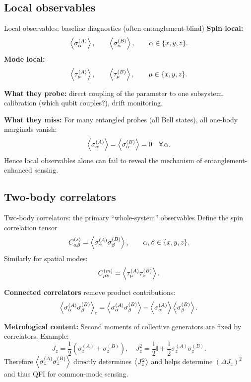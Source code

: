 \documentclass[aspectratio=169]{beamer}
\newcommand{\Id}{\mathbb{I}}
\newcommand{\sA}[1]{\sigma_{#1}^{(A)}}
\newcommand{\sB}[1]{\sigma_{#1}^{(B)}}
\newcommand{\tA}[1]{\tau_{#1}^{(A)}}
\newcommand{\tB}[1]{\tau_{#1}^{(B)}}
\newcommand{\Jop}[1]{J_{#1}}
\begin{document}
\subsection{Local observables}

\begin{frame}{Local observables: baseline diagnostics (often entanglement-blind)}
\small
\textbf{Spin local:}
\[
\expval{\sA{\alpha}},\qquad \expval{\sB{\alpha}},
\qquad \alpha\in\{x,y,z\}.
\]
\textbf{Mode local:}
\[
\expval{\tA{\mu}},\qquad \expval{\tB{\mu}},
\qquad \mu\in\{x,y,z\}.
\]

\vspace{0.35em}
\textbf{What they probe:}
direct coupling of the parameter to one subsystem, calibration (which qubit couples?), drift monitoring.

\vspace{0.35em}
\textbf{What they miss:}
For many entangled probes (all Bell states), all one-body marginals vanish:
\[
\expval{\sA{\alpha}}=\expval{\sB{\alpha}}=0\quad \forall\,\alpha.
\]
Hence local observables alone can fail to reveal the mechanism of entanglement-enhanced sensing.
\end{frame}

\subsection{Two-body correlators}

\begin{frame}{Two-body correlators: the primary ``whole-system'' observables}
\small
Define the spin correlation tensor
\[
C_{\alpha\beta}^{(s)}=\expval{\sA{\alpha}\sB{\beta}},
\qquad \alpha,\beta\in\{x,y,z\}.
\]
Similarly for spatial modes:
\[
C_{\mu\nu}^{(m)}=\expval{\tA{\mu}\tB{\nu}}.
\]

\vspace{0.35em}
\textbf{Connected correlators} remove product contributions:
\[
\expval{\sA{\alpha}\sB{\beta}}_c=
\expval{\sA{\alpha}\sB{\beta}}-\expval{\sA{\alpha}}\expval{\sB{\beta}}.
\]

\vspace{0.35em}
\textbf{Metrological content:}
Second moments of collective generators are fixed by correlators. Example:
\[
\Jop{z}=\frac12(\sA{z}+\sB{z}),
\quad
\Jop{z}^2
=
\frac12\Id + \frac12\sA{z}\sB{z}.
\]
Therefore $\expval{\sA{z}\sB{z}}$ directly determines $\expval{J_z^2}$ and helps determine $(\Delta J_z)^2$ and thus QFI for common-mode sensing. \citep{Pezze2018RMP}
\end{frame}
\end{document}

